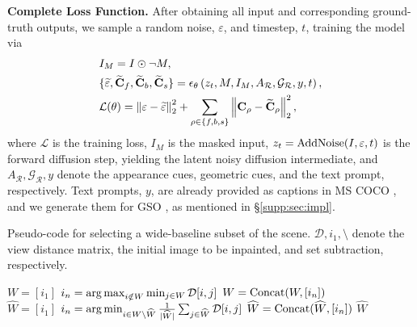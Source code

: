 \noindent\textbf{Complete Loss Function.}
After obtaining all input and corresponding ground-truth outputs, we sample a random noise, $\varepsilon$, and timestep, $t$, training the model via %
\begin{align}
&I_M = I \odot \neg M, \\
&\{ \widetilde{\varepsilon}, \widetilde{\mathbf{C}}_f, 
    \widetilde{\mathbf{C}}_b, \widetilde{\mathbf{C}}_s \} = 
    \epsilon_\theta\left(
        z_t, M, I_M, A_\mathcal{R}, \mathcal{G}_\mathcal{R}, y, t
    \right), \\
&\mathcal{L}(\theta) =
\left\|
    \varepsilon - \widetilde{\varepsilon} 
\right\|_2^2 
+
\sum_{\rho\in \{ f,b,s \} }
\left\|
    \mathbf{C}_\rho - \widetilde{\mathbf{C}}_\rho
\right\|_2^2,
\end{align}
where $ \mathcal{L} $ is the training loss, $I_M$ is the masked input, $z_t = \operatorname{AddNoise}(I, \varepsilon, t)$ is the forward diffusion step, yielding the latent noisy diffusion intermediate, and $A_\mathcal{R}, \mathcal{G}_\mathcal{R}, y$ denote the appearance cues, geometric cues, and the text prompt, respectively. Text prompts, $y$, are already provided as captions in MS COCO \cite{coco.dataset}, and we generate them for GSO \cite{gso.dataset}, as mentioned in \S\ref{supp:sec:impl}.

\begin{algorithm*}
\caption{Pseudo-code for selecting a wide-baseline subset of the scene. $\mathcal{D}, i_1, \setminus$ denote the view distance matrix, the initial image to be inpainted, and set subtraction, respectively.}
\begin{algorithmic}[1]
    \State $W = [i_1]$
        \State $i_n = \operatorname*{arg\,max}_{i \notin W} \min_{j \in W} \mathcal{D}[i, j]$
        \State $W = \operatorname{Concat}(W, [i_n])$
    \EndFor
    \\
    \State $\widehat{W} = [i_1]$
        \State $i_n = \operatorname*{arg\,min}_{i \in W \setminus \widehat{W}} \frac{1}{|\widehat{W}|} \sum_{j \in \widehat{W}} \mathcal{D}[i, j]$
        \State $\widehat{W} = \operatorname{Concat}(\widehat{W}, [i_n])$
    \EndFor
    \State \Return $\widehat{W}$
\EndProcedure
\end{algorithmic}
\label{alg:wide-baseline}
\end{algorithm*}

